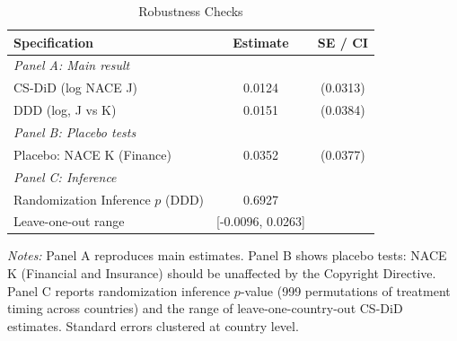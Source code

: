 \begin{table}[htbp]
\centering
\caption{Robustness Checks}
\label{tab:robustness}
\begin{tabular}{lcc}
\hline\hline
Specification & Estimate & SE / CI \\
\hline
\multicolumn{3}{l}{\textit{Panel A: Main result}} \\
CS-DiD (log NACE J) & 0.0124 & (0.0313) \\
DDD (log, J vs K) & 0.0151 & (0.0384) \\
[4pt]
\multicolumn{3}{l}{\textit{Panel B: Placebo tests}} \\
Placebo: NACE K (Finance) & 0.0352 & (0.0377) \\
[4pt]
\multicolumn{3}{l}{\textit{Panel C: Inference}} \\
Randomization Inference $p$ (DDD) & 0.6927 & \\
Leave-one-out range & [-0.0096, 0.0263] & \\
\hline\hline
\end{tabular}
\begin{tablenotes}[flushleft]\small
\item \textit{Notes:} Panel A reproduces main estimates. Panel B shows placebo tests: NACE K (Financial and Insurance) should be unaffected by the Copyright Directive. Panel C reports randomization inference $p$-value (999 permutations of treatment timing across countries) and the range of leave-one-country-out CS-DiD estimates. Standard errors clustered at country level.
\end{tablenotes}
\end{table}

